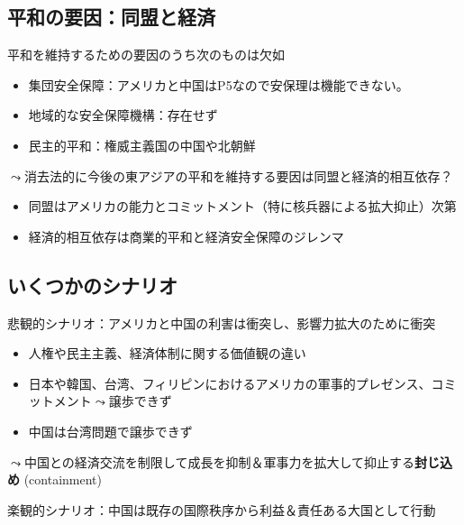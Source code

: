 \documentclass[
  xelatex,
  ja=standard]{bxjsarticle}
\providecommand{\tightlist}{%
  \setlength{\itemsep}{0pt}\setlength{\parskip}{0pt}}\usepackage{longtable,booktabs,array}
\begin{document}
\hypertarget{ux5e73ux548cux306eux8981ux56e0ux540cux76dfux3068ux7d4cux6e08}{%
\subsection{平和の要因：同盟と経済}\label{ux5e73ux548cux306eux8981ux56e0ux540cux76dfux3068ux7d4cux6e08}}

平和を維持するための要因のうち次のものは欠如

\begin{itemize}
\tightlist
\item
  集団安全保障：アメリカと中国はP5なので安保理は機能できない。
\item
  地域的な安全保障機構：存在せず
\item
  民主的平和：権威主義国の中国や北朝鮮
\end{itemize}

\(\leadsto\)消去法的に今後の東アジアの平和を維持する要因は同盟と経済的相互依存？

\begin{itemize}
\tightlist
\item
  同盟はアメリカの能力とコミットメント（特に核兵器による拡大抑止）次第
\item
  経済的相互依存は商業的平和と経済安全保障のジレンマ
\end{itemize}

\hypertarget{ux3044ux304fux3064ux304bux306eux30b7ux30caux30eaux30aa}{%
\subsection{いくつかのシナリオ}\label{ux3044ux304fux3064ux304bux306eux30b7ux30caux30eaux30aa}}

悲観的シナリオ：アメリカと中国の利害は衝突し、影響力拡大のために衝突

\begin{itemize}
\tightlist
\item
  人権や民主主義、経済体制に関する価値観の違い
\item
  日本や韓国、台湾、フィリピンにおけるアメリカの軍事的プレゼンス、コミットメント\(\leadsto\)譲歩できず
\item
  中国は台湾問題で譲歩できず
\end{itemize}

\(\leadsto\)中国との経済交流を制限して成長を抑制＆軍事力を拡大して抑止する\textbf{封じ込め}
(containment)

楽観的シナリオ：中国は既存の国際秩序から利益＆責任ある大国として行動
\end{document}
